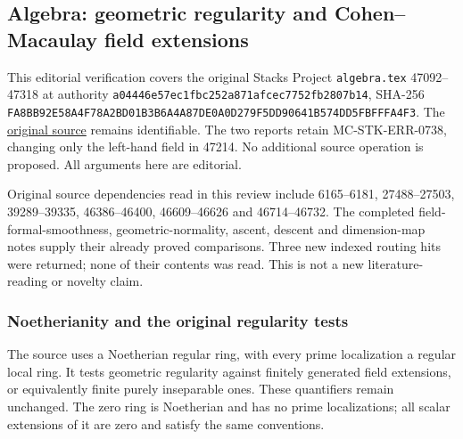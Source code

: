 \subsection{Algebra: geometric regularity and Cohen--Macaulay field extensions}\label{algebra-proof-071-algebra-geometric-regularity-and-cohenmacaulay-field-extensions}

This editorial verification covers the original Stacks Project \texttt{algebra.tex} 47092--47318 at authority \texttt{a044\allowbreak{}46e5\allowbreak{}7ec1\allowbreak{}fbc2\allowbreak{}52a8\allowbreak{}71af\allowbreak{}cec7\allowbreak{}752f\allowbreak{}b280\allowbreak{}7b14}, SHA-256 \texttt{FA8B\allowbreak{}B92E\allowbreak{}58A4\allowbreak{}F78A\allowbreak{}2BD0\allowbreak{}1B3B\allowbreak{}6A4A\allowbreak{}87DE\allowbreak{}0A0D\allowbreak{}279F\allowbreak{}5DD9\allowbreak{}0641\allowbreak{}B574\allowbreak{}DD5F\allowbreak{}BFFF\allowbreak{}A4F3}. The \href{https://github.com/stacks/stacks-project/blob/a04446e57ec1fbc252a871afcec7752fb2807b14/algebra.tex\#L47092}{original source} remains identifiable. The two reports retain MC-STK-ERR-0738, changing only the left-hand field in 47214. No additional source operation is proposed. All arguments here are editorial.

Original source dependencies read in this review include 6165--6181, 27488--27503, 39289--39335, 46386--46400, 46609--46626 and 46714--46732. The completed field-formal-smoothness, geometric-normality, ascent, descent and dimension-map notes supply their already proved comparisons. Three new indexed routing hits were returned; none of their contents was read. This is not a new literature-reading or novelty claim.

\subsubsection{Noetherianity and the original regularity tests}\label{algebra-proof-071-noetherianity-and-the-original-regularity-tests}

The source uses a Noetherian regular ring, with every prime localization a regular local ring. It tests geometric regularity against finitely generated field extensions, or equivalently finite purely inseparable ones. These quantifiers remain unchanged. The zero ring is Noetherian and has no prime localizations; all scalar extensions of it are zero and satisfy the same conventions.

